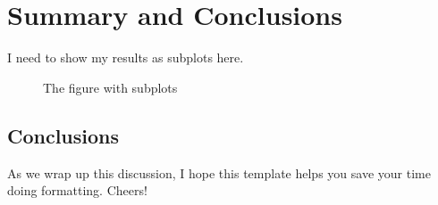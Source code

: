 \chapter{Summary and Conclusions}

I need to show my results as subplots here.

\begin{figure}[H]
    \centering
    \hfill
    \caption{The figure with subplots}
    \label{fig:two_plots}
\end{figure}


\newpage
\section{Conclusions}
As we wrap up this discussion, I hope this template helps you save your time doing formatting. Cheers!
\newpage
